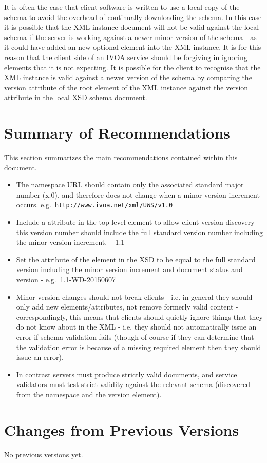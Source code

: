 \documentclass[10pt,a4paper]{ivoa}
\begin{document}
It is often the case that client software is written to use a local copy of the
schema to avoid the overhead of continually downloading the schema. In this case
it is possible that the XML instance document will not be valid against the
local schema if the server is working against a newer minor version of the
schema - as it could have added an new optional element into the XML instance.
It is for this reason that the client side of an IVOA service should be
forgiving in ignoring elements that it is not expecting. It is possible for the
client to recognise that the XML instance is valid against a newer version of
the schema by comparing the version attribute of the root element of the XML
instance against the version attribute in the local XSD schema document.

\section{Summary of Recommendations}
This section summarizes the main recommendations contained within this document.

\begin{itemize}
\item The namespace URL should contain only the associated standard major number
(x.0), and therefore does not change when a minor version increment occurs.
e.g.\ \texttt{http://www.ivoa.net/xml/UWS/v1.0}

\item Include a  attribute in the top level element to allow
client version discovery - this version number should include the full standard version
number including the minor version increment. -- 1.1

\item Set the  attribute of the  element in the
XSD to be equal to the full standard version including the minor version
increment and document status and version - e.g.\ 1.1-WD-20150607

\item Minor version changes should not break clients - i.e. in general they
should only add new elements/attributes, not remove formerly valid content -
correspondingly, this means that clients should quietly ignore things that they
do not know about in the XML - i.e. they should not automatically issue an error
if schema validation fails (though of course if they can determine that the
validation error is because of a missing required element then they should
issue an error).
\item In contrast servers must produce strictly valid documents, and service
validators must test strict validity against the relevant schema (discovered
from the namespace and the version element).
\end{itemize}




\appendix


\section{Changes from Previous Versions}

No previous versions yet.  



\end{document}
